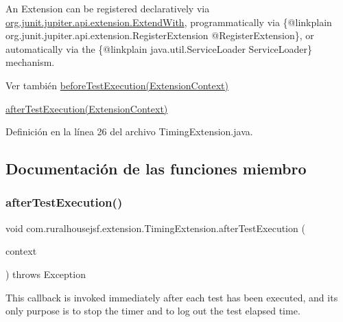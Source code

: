 An Extension can be registered {\ttfamily declaratively} via \mbox{\hyperlink{}{org.\+junit.\+jupiter.\+api.\+extension.\+Extend\+With}}, {\ttfamily programmatically} via \{@linkplain org.\+junit.\+jupiter.\+api.\+extension.\+Register\+Extension @\+Register\+Extension\}, or {\ttfamily automatically} via the \{@linkplain java.\+util.\+Service\+Loader Service\+Loader\} mechanism.

\begin{DoxySeeAlso}{Ver también}
\mbox{\hyperlink{classcom_1_1ruralhousejsf_1_1extension_1_1_timing_extension_ad19d0a2513bd9041f9263c1d9536ed6c}{before\+Test\+Execution(\+Extension\+Context)}} 

\mbox{\hyperlink{classcom_1_1ruralhousejsf_1_1extension_1_1_timing_extension_a300725ce5f0290e9878185e05d84c019}{after\+Test\+Execution(\+Extension\+Context)}} 
\end{DoxySeeAlso}


Definición en la línea 26 del archivo Timing\+Extension.\+java.



\subsection{Documentación de las funciones miembro}
\mbox{\label{classcom_1_1ruralhousejsf_1_1extension_1_1_timing_extension_a300725ce5f0290e9878185e05d84c019}} 
\subsubsection{\texorpdfstring{afterTestExecution()}{afterTestExecution()}}
{\footnotesize\ttfamily void com.\+ruralhousejsf.\+extension.\+Timing\+Extension.\+after\+Test\+Execution (\begin{DoxyParamCaption}\item[{Extension\+Context}]{context }\end{DoxyParamCaption}) throws Exception}

This callback is invoked {\ttfamily immediately after} each test has been executed, and its only purpose is to stop the timer and to log out the test elapsed time. 

